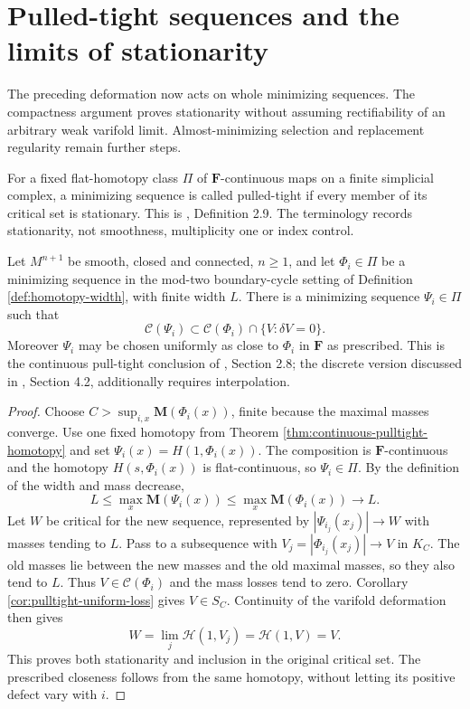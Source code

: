 \chapter{Pulled-tight sequences and the limits of stationarity}\label{sec:pulled-tight-limits}
The preceding deformation now acts on whole minimizing sequences. The compactness argument proves stationarity without assuming rectifiability of an arbitrary weak varifold limit. Almost-minimizing selection and replacement regularity remain further steps.

\begin{definition}\label{def:pulled-tight-sequence}
For a fixed flat-homotopy class $\Pi$ of $\mathbf F$-continuous maps on a finite simplicial complex, a minimizing sequence is called pulled-tight if every member of its critical set is stationary. This is \cite{MNIndex}, Definition 2.9. The terminology records stationarity, not smoothness, multiplicity one or index control.
\end{definition}

\begin{theorem}\label{thm:pulled-tight-minimizing-sequence}
Let $M^{n+1}$ be smooth, closed and connected, $n\geq1$, and let $\Phi_i\in\Pi$ be a minimizing sequence in the mod-two boundary-cycle setting of Definition \ref{def:homotopy-width}, with finite width $L$. There is a minimizing sequence $\Psi_i\in\Pi$ such that
\[
 \mathcal C(\Psi_i)\subset\mathcal C(\Phi_i)\cap\{V:\delta V=0\}.
\]
Moreover $\Psi_i$ may be chosen uniformly as close to $\Phi_i$ in $\mathbf F$ as prescribed. This is the continuous pull-tight conclusion of \cite{MNIndex}, Section 2.8; the discrete version discussed in \cite{LiAP}, Section 4.2, additionally requires interpolation.
\end{theorem}
\begin{proof}
Choose $C>\sup_{i,x}\mathbf M(\Phi_i(x))$, finite because the maximal masses converge. Use one fixed homotopy from Theorem \ref{thm:continuous-pulltight-homotopy} and set $\Psi_i(x)=H(1,\Phi_i(x))$. The composition is $\mathbf F$-continuous and the homotopy $H(s,\Phi_i(x))$ is flat-continuous, so $\Psi_i\in\Pi$. By the definition of the width and mass decrease,
\[
 L\leq\max_x\mathbf M(\Psi_i(x))\leq\max_x\mathbf M(\Phi_i(x))\longrightarrow L.
\]
Let $W$ be critical for the new sequence, represented by $|\Psi_{i_j}(x_j)|\to W$ with masses tending to $L$. Pass to a subsequence with $V_j=|\Phi_{i_j}(x_j)|\to V$ in $K_C$. The old masses lie between the new masses and the old maximal masses, so they also tend to $L$. Thus $V\in\mathcal C(\Phi_i)$ and the mass losses tend to zero. Corollary \ref{cor:pulltight-uniform-loss} gives $V\in S_C$. Continuity of the varifold deformation then gives
\[
 W=\lim_j\mathscr H(1,V_j)=\mathscr H(1,V)=V.
\]
This proves both stationarity and inclusion in the original critical set. The prescribed closeness follows from the same homotopy, without letting its positive defect vary with $i$.
\end{proof}


